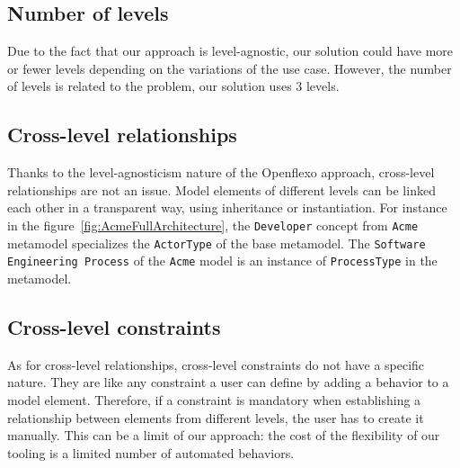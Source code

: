 
  \subsection{Number of levels}

  Due to the fact that our approach is level-agnostic, our solution could have
  more or fewer levels depending on the variations of the use case. However,
  the number of levels is related to the problem, our solution uses 3 levels.

  \subsection{Cross-level relationships}


  Thanks to the level-agnosticism nature of the Openflexo approach, cross-level
  relationships are not an issue. Model elements of different levels can be
  linked each other in a transparent way, using inheritance or instantiation.
  For instance in the figure~\ref{fig:AcmeFullArchitecture}, the
  \texttt{Developer} concept from \texttt{Acme} metamodel specializes the
  \texttt{ActorType} of the base metamodel. The \texttt{Software Engineering Process} of the
  \texttt{Acme} model is an instance of \texttt{ProcessType} in the metamodel.


  \subsection{Cross-level constraints}


  As for cross-level relationships, cross-level constraints do not have a
  specific nature. They are like any constraint a user can define by adding a
  behavior to a model element. Therefore, if a constraint is mandatory when
  establishing a relationship between elements from different levels, the user
  has to create it manually. This can be a limit of our approach: the cost of
  the flexibility of our tooling is a limited number of automated behaviors.

